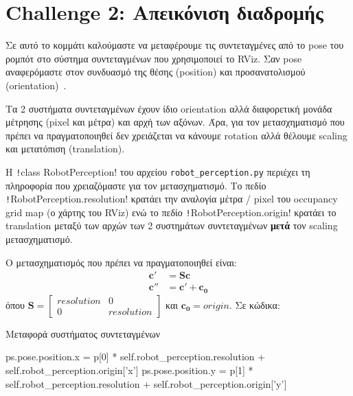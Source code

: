 \section{Challenge 2: Απεικόνιση διαδρομής}\label{section:ex2}
Σε αυτό το κομμάτι καλούμαστε να μεταφέρουμε τις συντεταγμένες από το pose του ρομπότ στο σύστημα συντεταγμένων που χρησιμοποιεί το RViz.
Σαν pose αναφερόμαστε στον συνδυασμό της θέσης (position) και προσανατολισμού (orientation)~\cite{shapiro2001computer}.

Τα 2 συστήματα συντεταγμένων έχουν ίδιο orientation αλλά διαφορετική μονάδα μέτρησης (pixel και μέτρα) και αρχή των αξόνων.
Άρα, για τον μετασχηματισμό που πρέπει να πραγματοποιηθεί δεν χρειάζεται να κάνουμε rotation αλλά θέλουμε scaling και μετατόπιση (translation).

\sloppy Η \texttt!class RobotPerception! του αρχείου \texttt{robot\_perception.py} περιέχει τη πληροφορία που χρειαζόμαστε για τον μετασχηματισμό.
Το πεδίο \texttt!RobotPerception.resolution! κρατάει την αναλογία μέτρα / pixel του occupancy grid map (ο χάρτης του RViz)
ενώ το πεδίο \texttt!RobotPerception.origin! κρατάει το translation μεταξύ των αρχών των 2 συστημάτων συντεταγμένων \textbf{μετά} τον scaling μετασχηματισμό.

Ο μετασχηματισμός που πρέπει να πραγματοποιηθεί είναι:
\begin{align}
    \mathbf{c'}  & = \mathbf{S} \mathbf{c}      \\
    \mathbf{c''} & = \mathbf{c'} + \mathbf{c_0}
\end{align}
όπου $\mathbf{S} = \begin{bmatrix}
resolution & 0 \\
0 & resolution
\end{bmatrix}$ και $\mathbf{c_0} = origin$.
Σε κώδικα:
\begin{code}
\caption{Μεταφορά συστήματος συντεταγμένων}
\begin{pythoncode}
ps.pose.position.x = p[0] * self.robot_perception.resolution + self.robot_perception.origin['x']
ps.pose.position.y = p[1] * self.robot_perception.resolution + self.robot_perception.origin['y']
\end{pythoncode}
\end{code}
